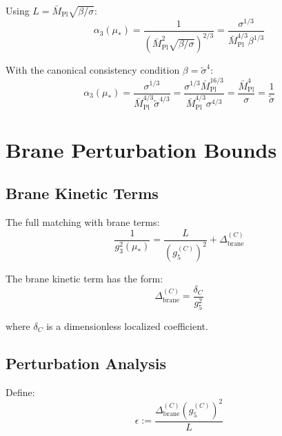 \documentclass[11pt,a4paper]{article}
\theoremstyle{definition}
\begin{document}
Using $L = \bar{M}_{\text{Pl}}\sqrt{\beta/\sigma}$:
\begin{equation}
\label{eq:alpha3-edc}
\alpha_3(\mu_*) = \frac{1}{\left(\bar{M}_{\text{Pl}}^2 \sqrt{\beta/\sigma}\right)^{2/3}}
  = \frac{\sigma^{1/3}}{\bar{M}_{\text{Pl}}^{4/3} \beta^{1/3}}
\end{equation}

With the canonical consistency condition $\beta = \tilde{\sigma}^4$:
\begin{equation}
\label{eq:alpha3-edc-canonical}
\alpha_3(\mu_*) = \frac{\sigma^{1/3}}{\bar{M}_{\text{Pl}}^{4/3} \tilde{\sigma}^{4/3}}
  = \frac{\sigma^{1/3} \bar{M}_{\text{Pl}}^{16/3}}{\bar{M}_{\text{Pl}}^{4/3} \sigma^{4/3}}
  = \frac{\bar{M}_{\text{Pl}}^4}{\sigma}
  = \frac{1}{\tilde{\sigma}}
\end{equation}

\section{Brane Perturbation Bounds}
\label{sec:brane-bounds}

\subsection{Brane Kinetic Terms}
\label{subsec:brane-kinetic}

The full matching with brane terms:
\begin{equation}
\label{eq:full-matching}
\frac{1}{g_3^2(\mu_*)} = \frac{L}{(g_5^{(C)})^2} + \Delta_{\text{brane}}^{(C)}
\end{equation}

The brane kinetic term has the form:
\begin{equation}
\label{eq:brane-form}
\Delta_{\text{brane}}^{(C)} = \frac{\delta_C}{g_5^2}
\end{equation}

where $\delta_C$ is a dimensionless localized coefficient.

\subsection{Perturbation Analysis}
\label{subsec:perturbation}

Define:
\begin{equation}
\label{eq:eps-def}
\epsilon := \frac{\Delta_{\text{brane}}^{(C)} (g_5^{(C)})^2}{L}
\end{equation}
\end{document}
